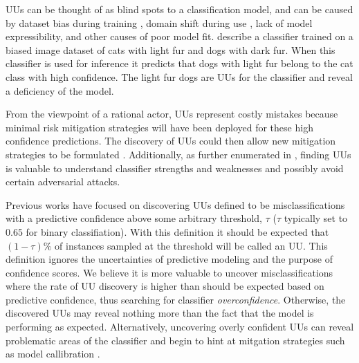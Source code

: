 \documentclass[letterpaper]{article} %
\newcommand{\wdb}[1]{{\color{blue} #1}} %
\begin{document}
UUs can be thought of as blind spots to a classification model, and can be caused by dataset bias during training \citep{stock2017convnets}, domain shift during use \citep{sugiyama2017dataset}, lack of model expressibility, and other causes of poor model fit. \citet{Lakkaraju2016} describe a classifier trained on a biased image dataset of cats with light fur and dogs with dark fur. When this classifier is used for inference it predicts that dogs with light fur belong to the cat class with high confidence.  The light fur dogs are UUs for the classifier and reveal a deficiency of the model.  

From the viewpoint of a rational actor, UUs represent costly mistakes because minimal risk mitigation strategies will have been deployed for these high confidence predictions.  The discovery of UUs could then allow new mitigation strategies to be formulated \citep{Nushi2016a}. Additionally, as further enumerated in \citet{Bansal2018}, finding UUs is valuable to understand classifier strengths and weaknesses and possibly avoid certain adversarial attacks.


Previous works have focused on discovering UUs defined to be misclassifications with a predictive confidence above some arbitrary threshold, $\tau$ ($\tau$ typically set to $0.65$ for binary classifiation).  With this definition it should be expected that $(1-\tau)$\% of instances sampled at the threshold will be called an UU. This definition ignores the uncertainties of predictive modeling and the purpose of confidence scores.  We believe it is more valuable to uncover misclassifications where the rate of UU discovery is higher than should be expected based on predictive confidence, thus searching for classifier \textit{overconfidence}. Otherwise, the discovered UUs may reveal nothing more than the fact that the model is performing as expected.  Alternatively, uncovering overly confident UUs can reveal problematic areas of the classifier and begin to hint at mitgation strategies such as model callibration \citep{bella2010calibration}.  
\end{document}
